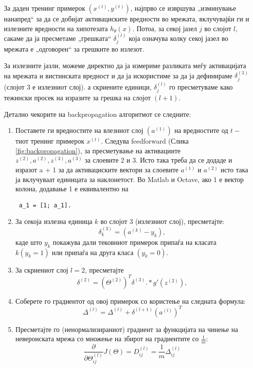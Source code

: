 За даден тренинг примерок $(x^{(t)}, y^{(t)})$, најпрво се извршува „изминување
нанапред“ за да се добијат активациските вредности во мрежата, вклучувајќи ги и
излезните вредности на хипотезата $h_\theta(x)$. Потоа, за секој јазел $j$ во
слојот $l$, сакаме да ја пресметаме „грешката“ $\delta_j^{(l)}$ која означува
колку секој јазел во мрежата е „одговорен“ за грешките во излезот.

За излезните јазли, можеме директно да ја измериме разликата меѓу активацијата
на мрежата и вистинската вредност и да ја искористиме за да ја дефинираме
$\delta_j^{(3)}$ (слојот 3 е излезниот слој). а скриените единици,
$\delta_j^{(l)}$ го пресметуваме како тежински просек на изразите за грешка на
слојот $(l + 1)$.

Детално чекорите на backpropagation алгоритмот се следните:

\begin{enumerate}
  \item Поставете ги вредностите на влезниот слој $(a^{(1)})$ на вредностите од
  $t-$тиот тренинг примерок $x^{(t)}$. Следува feedforward (Слика
  \ref{fig:backpropagation}), за пресметување на активациите $z^{(2)}, a^{(2)},
  z^{(3)}, a^{(3)}$ за слоевите 2 и 3. Исто така треба да се додаде и изразот a + 1 за да активациските
  вектори за слоевите $a^{(1)}$ и $a^{(2)}$ исто така ја вклучуваат единицата
  за наклонетост. Во Matlab и Octave, ако 1 е вектор колона, додавање 1 е
  еквивалентно на \begin{verbatim} a_1 = [1; a_1]. \end{verbatim}
  \item За секоја излезна единица $k$ во слојот 3 (излезниот слој), пресметајте:
  \[
  	\delta_k^{(3)} = (a^{(k)} - y_k),
	\]
	каде што $y_k $ покажува дали тековниот примерок припаѓа на класата $k (y_k =
	1)$ или припаѓа на друга класа $(y_k = 0)$.
  \item За скриениот слој $l = 2$, пресметајте
   	\[
  	\delta^{(2)} = (\Theta^{(2)})^T \delta^{(3)} .* g'(z^{(2)}),
	\]
	\item Соберете го градиентот од овој примерок со користење на следната формула:
	\[
  	\Delta^{(l)} = \Delta^{(l)} + \delta^{(l + 1)}(a^{(l)})^T
	\]
	\item Пресметајте го (ненормализираниот) градиент за функцијата на чинење на
	неверонската мрежа со множење на збирот на градиентите со $\frac{1}{m}$:
	 \[
  	\frac{\partial}{\partial\Theta_{ij}^{(l)}} J(\Theta) = D_{ij}^{(l)} =
  	\frac{1}{m}\Delta_{ij}^{(l)}
	\]
	
\end{enumerate} 


